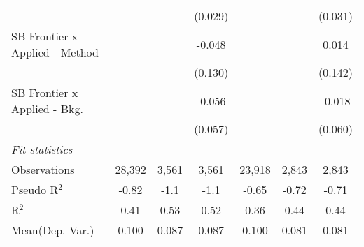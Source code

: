 \begin{tabular}{lcccccc}
                                  &             &                & (0.029)      &             &              & (0.031)\\   
   SB Frontier x Applied - Method &             &                & -0.048       &             &              & 0.014\\   
                                  &             &                & (0.130)      &             &              & (0.142)\\   
   SB Frontier x Applied - Bkg.   &             &                & -0.056       &             &              & -0.018\\   
                                  &             &                & (0.057)      &             &              & (0.060)\\   
   \midrule
   \emph{Fit statistics}\\
   Observations                   & 28,392      & 3,561          & 3,561        & 23,918      & 2,843        & 2,843\\  
   Pseudo R$^2$                   & -0.82       & -1.1           & -1.1         & -0.65       & -0.72        & -0.71\\  
   R$^2$                          & 0.41        & 0.53           & 0.52         & 0.36        & 0.44         & 0.44\\  
Mean(Dep. Var.) & 0.100 & 0.087 & 0.087 & 0.100 & 0.081 & 0.081 \\
   

\end{tabular}
